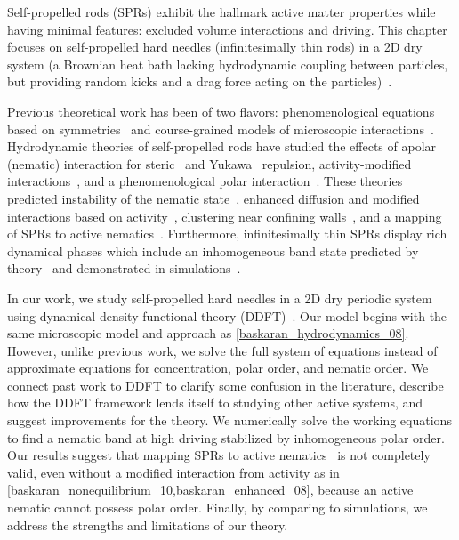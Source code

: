 Self-propelled rods (SPRs) exhibit the hallmark active matter properties while
having minimal features: excluded volume interactions and driving.  This chapter
focuses on self-propelled hard needles (infinitesimally thin rods) in a 2D dry
system (a Brownian heat bath lacking hydrodynamic coupling between particles,
but providing random kicks and a drag force acting on the
particles)~\cite{marchetti_hydrodynamics_13}. 

Previous theoretical work has been of two flavors: phenomenological equations
based on symmetries~\cite{toner_longrange_95, toner_flocks_98} and
course-grained models of microscopic interactions~\cite{bertin_hydrodynamic_09,
  baskaran_hydrodynamics_08, baskaran_enhanced_08, liverpool_instabilities_03}.
Hydrodynamic theories of self-propelled rods have studied the effects of apolar
(nematic) interaction for steric~\cite{baskaran_hydrodynamics_08} and
Yukawa~\cite{wensink_aggregation_08} repulsion, activity-modified
interactions~\cite{baskaran_enhanced_08}, and a phenomenological polar
interaction~\cite{mishra_fluctuations_10}. These theories predicted instability
of the nematic state~\cite{baskaran_hydrodynamics_08}, enhanced diffusion and
modified interactions based on activity~\cite{baskaran_enhanced_08}, clustering
near confining walls~\cite{wensink_aggregation_08}, and a mapping of SPRs to
active nematics~\cite{baskaran_selfregulation_12}.  Furthermore,
infinitesimally thin SPRs display rich dynamical phases which include an
inhomogeneous band state predicted by theory~\cite{baskaran_hydrodynamics_08,
  baskaran_selfregulation_12} and demonstrated in
simulations~\cite{ginelli_largescale_10, kuan_hysteresis_15}.

In our work, we study self-propelled
hard needles in a 2D dry periodic system using dynamical density functional theory
(DDFT)~\cite{evans_nature_79, marconi_dynamic_99, marconi_dynamic_00,
  archer_dynamical_04}.  Our model begins with the same microscopic model and
approach as \cref{baskaran_hydrodynamics_08}.  However, unlike previous work, we
solve the full system of equations instead of 
approximate equations for 
concentration, polar order, and nematic order. We connect past work to DDFT to
clarify some confusion in the literature, describe how the DDFT framework
lends itself to studying other active systems, and suggest improvements
for the theory. We numerically solve the working equations to find a nematic band
at high driving stabilized by inhomogeneous polar order.  Our results
suggest that mapping SPRs to active
nematics~\cite{baskaran_selfregulation_12} is not completely valid, even
without a modified interaction from activity as in
\cref{baskaran_nonequilibrium_10,baskaran_enhanced_08}, because an active
nematic cannot possess polar order. Finally, by comparing to
simulations, we address the strengths and limitations of our theory.

